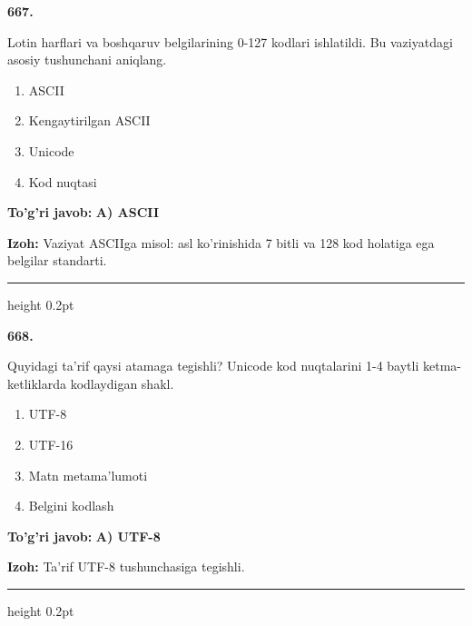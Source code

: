 \documentclass[10pt,a4paper,oneside]{article}
\begin{document}
\noindent\textbf{\color{ink}667.}
\par
Lotin harflari va boshqaruv belgilarining 0-127 kodlari ishlatildi. Bu vaziyatdagi asosiy tushunchani aniqlang.
\begin{enumerate}[label=\Alph*),leftmargin=9mm]
\item ASCII
\item Kengaytirilgan ASCII
\item Unicode
\item Kod nuqtasi
\end{enumerate}
\begin{tcolorbox}[enhanced,breakable,colback=teal!4,colframe=teal!50!black,boxrule=0.5pt,arc=1.1mm,left=3mm,right=3mm,top=1.7mm,bottom=1.7mm,before skip=2mm,after skip=2mm]
\textbf{\color{teal}To'g'ri javob:} \textbf{A) ASCII}
\par\smallskip
\textbf{Izoh:} Vaziyat ASCIIga misol: asl ko'rinishida 7 bitli va 128 kod holatiga ega belgilar standarti.
\end{tcolorbox}
\vspace{2mm}\hrule height 0.2pt \vspace{3mm}

\noindent\textbf{\color{ink}668.}
\par
Quyidagi ta'rif qaysi atamaga tegishli? Unicode kod nuqtalarini 1-4 baytli ketma-ketliklarda kodlaydigan shakl.
\begin{enumerate}[label=\Alph*),leftmargin=9mm]
\item UTF-8
\item UTF-16
\item Matn metama'lumoti
\item Belgini kodlash
\end{enumerate}
\begin{tcolorbox}[enhanced,breakable,colback=teal!4,colframe=teal!50!black,boxrule=0.5pt,arc=1.1mm,left=3mm,right=3mm,top=1.7mm,bottom=1.7mm,before skip=2mm,after skip=2mm]
\textbf{\color{teal}To'g'ri javob:} \textbf{A) UTF-8}
\par\smallskip
\textbf{Izoh:} Ta'rif UTF-8 tushunchasiga tegishli.
\end{tcolorbox}
\vspace{2mm}\hrule height 0.2pt \vspace{3mm}
\end{document}
